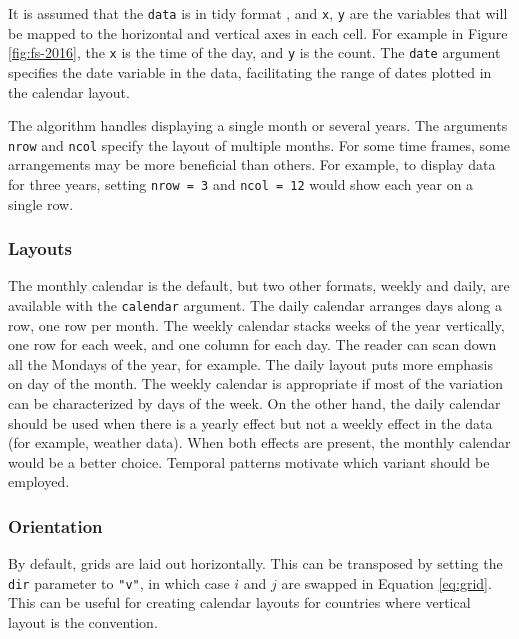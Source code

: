 \documentclass[12pt]{article}
\begin{document}
It is assumed that the \texttt{data} is in tidy format \citep{wickham2014tidy}, and \texttt{x}, \texttt{y} are the variables that will be mapped to the horizontal and vertical axes in each cell. For example in Figure \ref{fig:fs-2016}, the \texttt{x} is the time of the day, and \texttt{y} is the count. The \texttt{date} argument specifies the date variable in the data, facilitating the range of dates plotted in the calendar layout.

The algorithm handles displaying a single month or several years. The arguments \texttt{nrow} and \texttt{ncol} specify the layout of multiple months. For some time frames, some arrangements may be more beneficial than others. For example, to display data for three years, setting \texttt{nrow\ =\ 3} and \texttt{ncol\ =\ 12} would show each year on a single row.

\hypertarget{layouts}{%
\subsubsection{Layouts}\label{layouts}}

The monthly calendar is the default, but two other formats, weekly and daily, are available with the \texttt{calendar} argument. The daily calendar arranges days along a row, one row per month. The weekly calendar stacks weeks of the year vertically, one row for each week, and one column for each day. The reader can scan down all the Mondays of the year, for example. The daily layout puts more emphasis on day of the month. The weekly calendar is appropriate if most of the variation can be characterized by days of the week. On the other hand, the daily calendar should be used when there is a yearly effect but not a weekly effect in the data (for example, weather data). When both effects are present, the monthly calendar would be a better choice. Temporal patterns motivate which variant should be employed.

\hypertarget{orientation}{%
\subsubsection{Orientation}\label{orientation}}

By default, grids are laid out horizontally. This can be transposed by setting the \texttt{dir} parameter to \texttt{"v"}, in which case \(i\) and \(j\) are swapped in Equation \eqref{eq:grid}. This can be useful for creating calendar layouts for countries where vertical layout is the convention.
\end{document}
